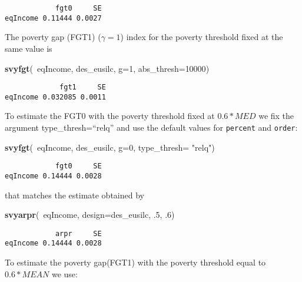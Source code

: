 \documentclass[]{book}
\newenvironment{Shaded}{\begin{snugshade}}{\end{snugshade}}
\newcommand{\KeywordTok}[1]{\textcolor[rgb]{0.13,0.29,0.53}{\textbf{{#1}}}}
\newcommand{\DataTypeTok}[1]{\textcolor[rgb]{0.13,0.29,0.53}{{#1}}}
\newcommand{\DecValTok}[1]{\textcolor[rgb]{0.00,0.00,0.81}{{#1}}}
\newcommand{\StringTok}[1]{\textcolor[rgb]{0.31,0.60,0.02}{{#1}}}
\newcommand{\NormalTok}[1]{{#1}}
\begin{document}
\begin{verbatim}
            fgt0     SE
eqIncome 0.11444 0.0027
\end{verbatim}

The poverty gap (FGT1) (\(\gamma=1\)) index for the poverty threshold
fixed at the same value is

\begin{Shaded}
\begin{Highlighting}[]
\KeywordTok{svyfgt}\NormalTok{(~eqIncome, des_eusilc, }\DataTypeTok{g=}\DecValTok{1}\NormalTok{, }\DataTypeTok{abs_thresh=}\DecValTok{10000}\NormalTok{)}
\end{Highlighting}
\end{Shaded}

\begin{verbatim}
             fgt1     SE
eqIncome 0.032085 0.0011
\end{verbatim}

To estimate the FGT0 with the poverty threshold fixed at \(0.6* MED\) we
fix the argument type\_thresh=``relq'' and use the default values for
\texttt{percent} and \texttt{order}:

\begin{Shaded}
\begin{Highlighting}[]
\KeywordTok{svyfgt}\NormalTok{(~eqIncome, des_eusilc, }\DataTypeTok{g=}\DecValTok{0}\NormalTok{, }\DataTypeTok{type_thresh=} \StringTok{"relq"}\NormalTok{)}
\end{Highlighting}
\end{Shaded}

\begin{verbatim}
            fgt0     SE
eqIncome 0.14444 0.0028
\end{verbatim}

that matches the estimate obtained by

\begin{Shaded}
\begin{Highlighting}[]
\KeywordTok{svyarpr}\NormalTok{(~eqIncome, }\DataTypeTok{design=}\NormalTok{des_eusilc, .}\DecValTok{5}\NormalTok{, .}\DecValTok{6}\NormalTok{)}
\end{Highlighting}
\end{Shaded}

\begin{verbatim}
            arpr     SE
eqIncome 0.14444 0.0028
\end{verbatim}

To estimate the poverty gap(FGT1) with the poverty threshold equal to
\(0.6*MEAN\) we use:
\end{document}
